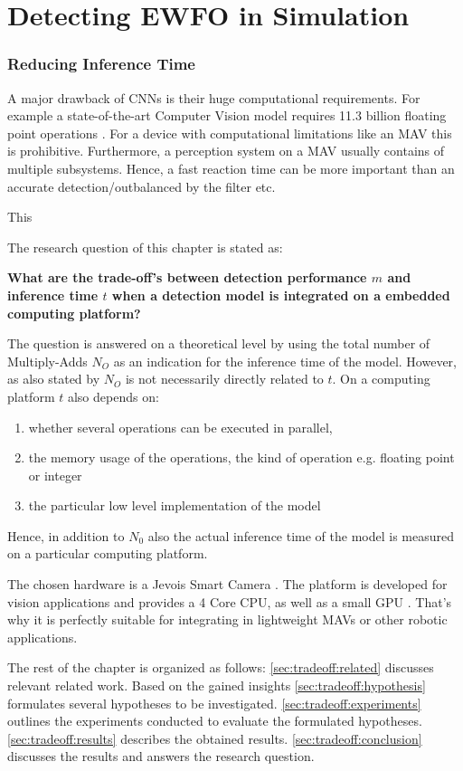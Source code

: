	\chapter{Detecting \ac{EWFO} in Simulation}
	\label{sec:object_detection}
	
	\subsection{Reducing Inference Time}
	
	A major drawback of \acp{CNN} is their huge computational requirements. For example a state-of-the-art Computer Vision model \cite{He2015} requires 11.3 billion floating point operations \cite{Tschannen2017}. For a device with computational limitations like an \ac{MAV} this is prohibitive. Furthermore, a perception system on a \ac{MAV} usually contains of multiple subsystems. Hence, a fast reaction time can be more important than an accurate detection/outbalanced by the filter etc.
	
	This
	
	The research question of this chapter is stated as:
	
	\begin{center}
		\textbf{What are the trade-off's between detection performance $m$ and inference time $t$ when a detection model is integrated on a embedded computing platform?}
	\end{center}
	
	The question is answered on a theoretical level by using the total number of \ac{Multiply-Adds} $N_O$ as an indication for the inference time of the model. However, as also stated by  $N_O$ is not necessarily directly related to $t$. On a computing platform $t$ also depends on:
	
	\begin{enumerate}
		\item whether several operations can be executed in parallel,
		\item the memory usage of the operations, the kind of operation e.g. floating point or integer
		\item the particular low level implementation of the model
	\end{enumerate} 
	
	Hence, in addition to $N_0$ also the actual inference time of the model is measured on a particular computing platform.
	
	The chosen hardware is a Jevois Smart Camera . The platform is developed for vision applications and provides a 4 Core CPU, as well as a small GPU . That's why it is perfectly suitable for integrating in lightweight \acp{MAV} or other robotic applications.
	
	The rest of the chapter is organized as follows: \autoref{sec:tradeoff:related} discusses relevant related work. Based on the gained insights \autoref{sec:tradeoff:hypothesis} formulates several hypotheses to be investigated. \autoref{sec:tradeoff:experiments} outlines the experiments conducted to evaluate the formulated hypotheses. \autoref{sec:tradeoff:results} describes the obtained results. \autoref{sec:tradeoff:conclusion} discusses the results and answers the research question.
	
